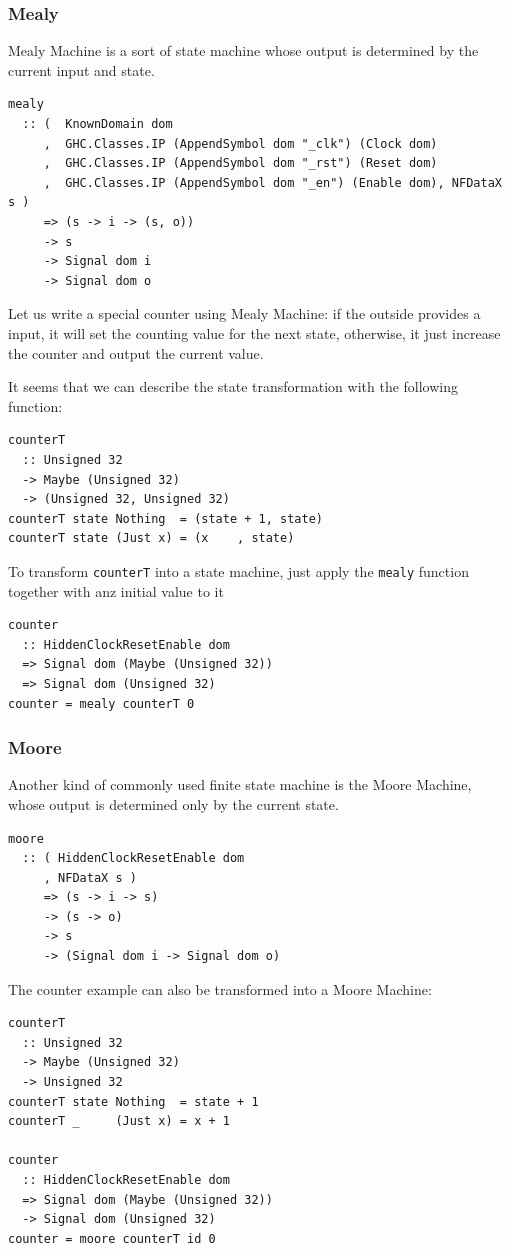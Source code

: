 \documentclass[a4paper,12pt, oneside]{book}
\begin{document}
\subsubsection{Mealy}
Mealy Machine is a sort of state machine whose output is determined by the current input and state.
\begin{verbatim}
mealy
  :: (  KnownDomain dom
     ,  GHC.Classes.IP (AppendSymbol dom "_clk") (Clock dom)
     ,  GHC.Classes.IP (AppendSymbol dom "_rst") (Reset dom)
     ,  GHC.Classes.IP (AppendSymbol dom "_en") (Enable dom), NFDataX s ) 
     => (s -> i -> (s, o)) 
     -> s 
     -> Signal dom i 
     -> Signal dom o
\end{verbatim}
Let us write a special counter using Mealy Machine: if the outside provides a input, it will set the counting value for the next state, otherwise, it just increase the counter and output the current value.

It seems that we can describe the state transformation with the following function:
\begin{verbatim}
counterT 
  :: Unsigned 32 
  -> Maybe (Unsigned 32) 
  -> (Unsigned 32, Unsigned 32)
counterT state Nothing  = (state + 1, state)
counterT state (Just x) = (x    , state)
\end{verbatim}
To transform \texttt{counterT} into a state machine, just apply the \texttt{mealy} function together with anz initial value to it
\begin{verbatim}
counter 
  :: HiddenClockResetEnable dom
  => Signal dom (Maybe (Unsigned 32))
  => Signal dom (Unsigned 32)
counter = mealy counterT 0
\end{verbatim}
\subsubsection{Moore}
Another kind of commonly used finite state machine is the Moore Machine, whose output is determined only by the current state.
\begin{verbatim}
moore
  :: ( HiddenClockResetEnable dom
     , NFDataX s )
     => (s -> i -> s)
     -> (s -> o)
     -> s
     -> (Signal dom i -> Signal dom o)
\end{verbatim}
The counter example can also be transformed into a Moore Machine:
\begin{verbatim}
counterT 
  :: Unsigned 32 
  -> Maybe (Unsigned 32) 
  -> Unsigned 32
counterT state Nothing  = state + 1
counterT _     (Just x) = x + 1

counter 
  :: HiddenClockResetEnable dom
  => Signal dom (Maybe (Unsigned 32))
  -> Signal dom (Unsigned 32)
counter = moore counterT id 0
\end{verbatim}
\end{document}

